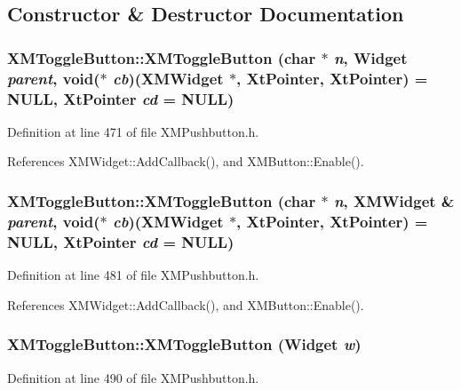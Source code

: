 \subsection{Constructor \& Destructor Documentation}
\subsubsection{\setlength{\rightskip}{0pt plus 5cm}XMToggle\-Button::XMToggle\-Button (char $\ast$ {\em n}, Widget {\em parent}, void($\ast$ {\em cb})({\bf XMWidget} $\ast$, Xt\-Pointer, Xt\-Pointer) = NULL, Xt\-Pointer {\em cd} = NULL)\hspace{0.3cm}{\tt  [inline]}}\label{classXMToggleButton_a0}




Definition at line 471 of file XMPushbutton.h.

References XMWidget::Add\-Callback(), and XMButton::Enable().
\subsubsection{\setlength{\rightskip}{0pt plus 5cm}XMToggle\-Button::XMToggle\-Button (char $\ast$ {\em n}, {\bf XMWidget} \& {\em parent}, void($\ast$ {\em cb})({\bf XMWidget} $\ast$, Xt\-Pointer, Xt\-Pointer) = NULL, Xt\-Pointer {\em cd} = NULL)\hspace{0.3cm}{\tt  [inline]}}\label{classXMToggleButton_a1}




Definition at line 481 of file XMPushbutton.h.

References XMWidget::Add\-Callback(), and XMButton::Enable().
\subsubsection{\setlength{\rightskip}{0pt plus 5cm}XMToggle\-Button::XMToggle\-Button (Widget {\em w})\hspace{0.3cm}{\tt  [inline]}}\label{classXMToggleButton_a2}




Definition at line 490 of file XMPushbutton.h.

